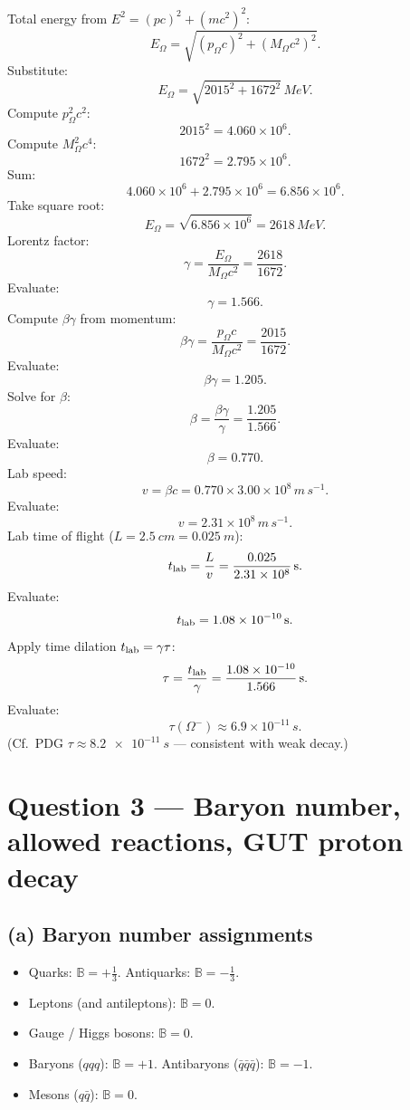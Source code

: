 \documentclass[11pt]{article}
\begin{document}
Total energy from $E^2 = (pc)^2 + (mc^2)^2$:
\[ E_\Omega = \sqrt{(p_\Omega c)^2 + (M_\Omega c^2)^2}. \]
Substitute:
\[ E_\Omega = \sqrt{2015^2 + 1672^2}\,\si{MeV}. \]
Compute $p_\Omega^2 c^2$:
\[ 2015^2 = 4.060\times 10^{6}. \]
Compute $M_\Omega^2 c^4$:
\[ 1672^2 = 2.795\times 10^{6}. \]
Sum:
\[ 4.060\times 10^{6} + 2.795\times 10^{6} = 6.856\times 10^{6}. \]
Take square root:
\[ E_\Omega = \sqrt{6.856\times 10^{6}} = 2618\,\si{MeV}. \]
Lorentz factor:
\[ \gamma = \frac{E_\Omega}{M_\Omega c^2} = \frac{2618}{1672}. \]
Evaluate:
\[ \gamma = 1.566. \]
Compute $\beta\gamma$ from momentum:
\[ \beta\gamma = \frac{p_\Omega c}{M_\Omega c^2} = \frac{2015}{1672}. \]
Evaluate:
\[ \beta\gamma = 1.205. \]
Solve for $\beta$:
\[ \beta = \frac{\beta\gamma}{\gamma} = \frac{1.205}{1.566}. \]
Evaluate:
\[ \beta = 0.770. \]
Lab speed:
\[ v = \beta c = 0.770\times 3.00\times 10^{8}\,\si{m\,s^{-1}}. \]
Evaluate:
\[ v = 2.31\times 10^{8}\,\si{m\,s^{-1}}. \]
Lab time of flight ($L = \SI{2.5}{cm} = \SI{0.025}{m}$):
\[ t_{\rm lab} = \frac{L}{v} = \frac{0.025}{2.31\times 10^{8}}\,\si{s}. \]
Evaluate:
\[ t_{\rm lab} = 1.08\times 10^{-10}\,\si{s}. \]
Apply time dilation $t_{\rm lab} = \gamma\tau$:
\[ \tau = \frac{t_{\rm lab}}{\gamma} = \frac{1.08\times 10^{-10}}{1.566}\,\si{s}. \]
Evaluate:
\[ \boxed{\;\tau(\Omega^-) \approx 6.9\times 10^{-11}\,\si{s}.\;} \]
(Cf.\ PDG $\tau\approx \SI{8.2e-11}{s}$ — consistent with weak decay.)

\section*{Question 3 --- Baryon number, allowed reactions, GUT proton decay}

\subsection*{(a) Baryon number assignments}

\begin{itemize}
\item Quarks: $\mathbb{B}=+\tfrac13$. Antiquarks: $\mathbb{B}=-\tfrac13$.
\item Leptons (and antileptons): $\mathbb{B}=0$.
\item Gauge / Higgs bosons: $\mathbb{B}=0$.
\item Baryons ($qqq$): $\mathbb{B}=+1$. Antibaryons ($\bar q\bar q\bar q$): $\mathbb{B}=-1$.
\item Mesons ($q\bar q$): $\mathbb{B}=0$.
\end{itemize}
\end{document}
